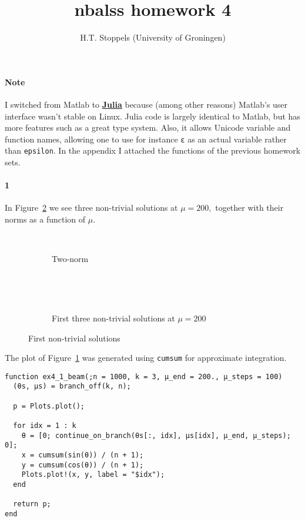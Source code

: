 \documentclass[a4paper]{article}
\author{H.T. Stoppels (University of Groningen)}
\title{{\sc nbalss} homework 4}
\begin{document}
  \maketitle 

  \paragraph{Note} I switched from Matlab to \href{http://julialang.org/blog/2017/03/julia-fresh-paper}{\bf Julia} because (among other reasons) Matlab's user interface wasn't stable on Linux. Julia code is largely identical to Matlab, but has more features such as a great type system. Also, it allows Unicode variable and function names, allowing one to use for instance {\tt ɛ} as an actual variable rather than {\tt epsilon}. In the appendix I attached the functions of the previous homework sets.

  \paragraph{1} In Figure~\ref{fig:solutions} we see three non-trivial solutions at $\mu = 200,$ together with their norms as a function of $\mu.$

  \begin{figure}[h]
    \begin{subfigure}[b]{0.5\textwidth}
      ~
      \caption{Two-norm}
    \end{subfigure}
    \begin{subfigure}[b]{0.5\textwidth}
      ~
      \caption{First three non-trivial solutions at $\mu = 200$}~
      \label{fig:beam_sol}
    \end{subfigure}
    \caption{First non-trivial solutions}
    \label{fig:solutions}
  \end{figure}

  \noindent The plot of Figure~\ref{fig:beam_sol} was generated using {\tt cumsum} for approximate integration.
\begin{verbatim}
function ex4_1_beam(;n = 1000, k = 3, μ_end = 200., μ_steps = 100)
  (θs, μs) = branch_off(k, n);

  p = Plots.plot();

  for idx = 1 : k
    θ = [0; continue_on_branch(θs[:, idx], μs[idx], μ_end, μ_steps); 0];
    x = cumsum(sin(θ)) / (n + 1);
    y = cumsum(cos(θ)) / (n + 1);
    Plots.plot!(x, y, label = "$idx");
  end

  return p;
end
\end{verbatim}
\end{document}
